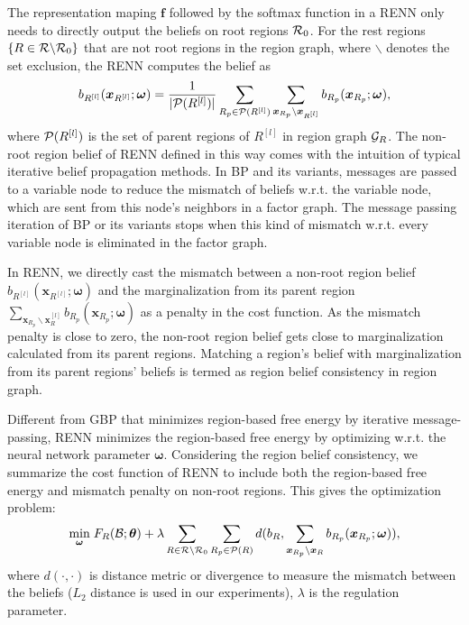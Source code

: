 The representation maping $\bm{f}$ followed by the softmax function in a RENN only needs to directly output the beliefs on root regions $\mathcal{R}_0$.
For the rest regions $\left\{R \in \mathcal{R} \backslash \mathcal{R}_0 \right\}$ that are not root regions in the region graph, where $\backslash$ denotes the set exclusion, the RENN computes the belief as
\begin{equation}\label{eq:l-level-beliefs}
  b_{R^{[l]}}(\bm{x}_{R^{[l]}}; \bm{\omega}) = \frac{1}{|\mathcal{P}(R^{[l]})|} \sum_{R_p\in  \mathcal{P}(R^{[l]})}\sum_{\bm{x}_{R_p}\backslash \bm{x}_{R^{[l]}}} b_{R_p}(\bm{x}_{R_p}; \bm{\omega}),
\end{equation}
where $\mathcal{P}(R^{[l]})$ is the set of parent regions of $R^{[l]}$ in region graph $\mathcal{G}_R$. The non-root region belief of RENN defined in this way comes with the intuition of typical iterative belief propagation methods. In BP and its variants, messages are passed to a variable node to reduce the mismatch of beliefs w.r.t. the variable node, which are sent from this node's neighbors in a factor graph. The message passing iteration of BP or its variants stops when this kind of mismatch w.r.t. every variable node is eliminated in the factor graph.

In RENN, we directly cast the mismatch between a non-root region belief $b_{R^{[l]}}(\bm{x}_{R^{[l]}}; \bm{\omega})$ and the marginalization from its parent region $\sum_{\bm{x}_{R_p}\backslash \bm{x}_R^{[l]}}b_{R_p}(\bm{x}_{R_p}; \bm{\omega})$ as a penalty in the cost function. As the mismatch penalty is close to zero, the non-root region belief gets close to marginalization calculated from its parent regions. Matching a region's belief with marginalization from its parent regions' beliefs is termed as region belief consistency in region graph.

Different from GBP that minimizes region-based free energy by iterative message-passing, RENN minimizes the region-based free energy by optimizing w.r.t. the neural network parameter $\bm{\omega}$.
Considering the region belief consistency, we summarize the cost function of RENN to include both the region-based free energy and mismatch penalty on non-root regions. This gives the optimization problem:
\begin{equation}\label{eq:infer-F-all-belief}
  \underset{\bm{\omega}}{\min}\;{F_R(\mathcal{B};\bm{\theta}) + \lambda \sum_{R\in \mathcal{R} \backslash \mathcal{R}_0} \sum_{R_p \in \mathcal{P}(R)} d( b_R, \sum_{\bm{x}_{R_p}\backslash \bm{x}_{R}} b_{R_p}(\bm{x}_{R_p}; \bm{\omega}))},
\end{equation}
where $d(\cdot, \cdot)$ is distance metric or divergence to measure the mismatch between the beliefs ($L_2$ distance is used in our experiments), $\lambda$ is the regulation parameter.

